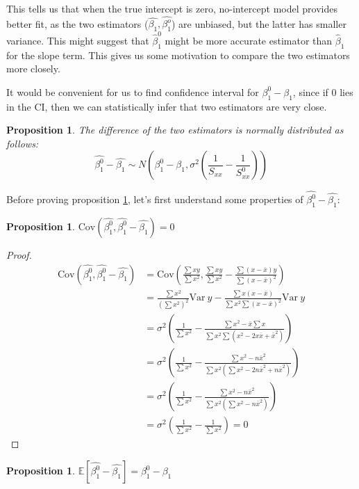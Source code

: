 \documentclass[12pt,a4paper,oneside]{book} %
\newtheorem{proposition}[theorem]{Proposition}
\newcommand{\E}{\mathbb{E}}
\newcommand{\Var}{\mathrm{Var}}
\newcommand{\Cov}{\mathrm{Cov}}
\begin{document}
This tells us that when the true intercept is zero, no-intercept model provides better fit, as the two estimators ($\hat{\beta_1}, \hat{\beta_1^o}$) are unbiased, but the latter has smaller variance. 
This might suggest that $\hat{\beta}_1^0$ might be more accurate estimator than $\hat{\beta}_1$ for the slope term. This gives us some motivation to compare the two estimators more closely.

It would be convenient for us to find confidence interval for $\beta_1^0 - \beta_1$, since if 0 lies in the CI, then we can statistically infer that two estimators are very close.

\begin{proposition} \label{prop:normally}
	The difference of the two estimators is normally distributed as follows: 
	\[
		\hat{\beta_1^0}-\hat{\beta_1} \sim N(\beta_1^0-\beta_1, \sigma^2(\frac{1}{S_{xx}}-\frac{1}{S_{xx}^0}))
	\]
\end{proposition}

	Before proving proposition \ref{prop:normally}, let's first understand some properties of $\hat{\beta_1^0}-\hat{\beta_1}$:

\begin{proposition}
	$\Cov (\hat{\beta_1^0},\hat{\beta_1^0}-\hat{\beta_1})=0$
\end{proposition}

\begin{proof}
	\begin{align*}
		\Cov (\hat{\beta_1^0},\hat{\beta_1^0}-\hat{\beta_1}) &=
		\Cov (\frac{\sum xy}{\sum x^2},\frac{\sum xy}{\sum x^2}-\frac{\sum (x-\bar{x})y}{\sum (x-\bar{x})^2})  \\
		&= \frac{\sum x^2}{(\sum x^2)^2} \Var\  y - \frac{\sum x(x-\bar{x})}{\sum x^2 \sum (x-\bar{x})^2} \Var \ y \\
		&=\sigma^2(\frac{1}{\sum x^2} - \frac{\sum x^2 - \bar{x}\sum x}{\sum x^2 \sum(x^2-2x\bar{x}+\bar{x}^2)}) \\
		&= \sigma^2 (\frac{1}{\sum x^2}-\frac{\sum x^2 - n \bar{x}^2}{\sum x^2(\sum x^2 - 2n\bar{x}^2+n\bar{x}^2)}) \\
		&=\sigma^2 (\frac{1}{\sum x^2}-\frac{\sum x^2 - n \bar{x}^2}{\sum x^2(\sum x^2 -n\bar{x}^2)}) \\
		&= \sigma^2(\frac{1}{\sum x^2}-\frac{1}{\sum x^2})=0
	\end{align*}
\end{proof}

\begin{proposition}
	$\E [\hat{\beta_1^0}-\hat{\beta_1}]=\beta_1^0-\beta_1$ 
\end{proposition}
\end{document}
